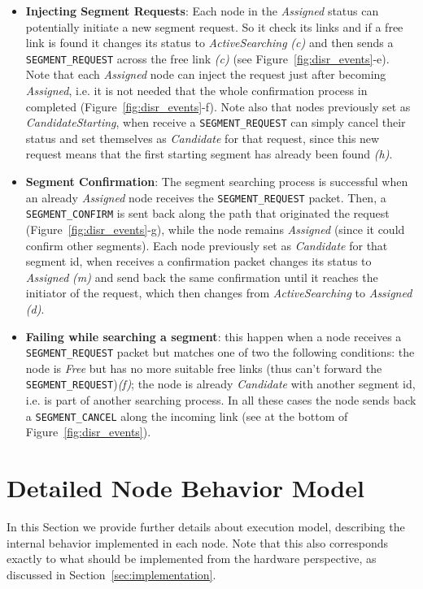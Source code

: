 \begin{itemize}
\item{\textbf{Injecting Segment Requests}}: Each node in the
\emph{Assigned} status can potentially initiate a new segment request.
So it check its links and if a free link is found it changes its
status to \emph{ActiveSearching} \emph{(c)} and then sends
a \texttt{SEGMENT\_REQUEST} across the free link \emph{(c)} (see
Figure~\ref{fig:disr_events}-e). 
Note that each \emph{Assigned} node can inject the request just after
becoming \emph{Assigned}, i.e. it is not needed that the whole confirmation
process in completed (Figure~\ref{fig:disr_events}-f).
Note also that nodes previously set as \emph{CandidateStarting}, when receive
a \texttt{SEGMENT\_REQUEST} can simply cancel their
status and set themselves as \emph{Candidate} for that request, since this new
request means that the first starting segment has already been found \emph{(h)}. 
\item{\textbf{Segment Confirmation}}: The segment searching process is successful
when an already \emph{Assigned} node receives the
\texttt{SEGMENT\_REQUEST} packet. Then, a \texttt{SEGMENT\_CONFIRM} is
sent back along the path that originated the request
(Figure~\ref{fig:disr_events}-g), while the
node remains \emph{Assigned} (since it could confirm other segments). Each node
previously set as \emph{Candidate} for that segment id, when receives a confirmation packet changes its status to \emph{Assigned} \emph{(m)} and send back
the same confirmation until it reaches the initiator of the request,
which then changes from \emph{ActiveSearching} to \emph{Assigned} \emph{(d)}.

\item{\textbf{Failing while searching a segment}}: this happen when a node receives a \texttt{SEGMENT\_REQUEST} packet but
matches one of two the following conditions: the node is \emph{Free} but has no
more suitable free links (thus can’t forward the
\texttt{SEGMENT\_REQUEST})\emph{(f)}; the node
is already \emph{Candidate} with another segment id, i.e. is part of another searching process. In all these cases the node
sends back a \texttt{SEGMENT\_CANCEL} along the incoming link (see at
the bottom of Figure~\ref{fig:disr_events}).
\end{itemize}


\section{Detailed Node Behavior Model}
\label{sec:execution_model}

In this Section we provide further details about \disr{}
execution model, describing the internal behavior implemented in
each node. Note that this also corresponds exactly to what should be
implemented from the hardware perspective, as discussed in
Section~\ref{sec:implementation}.

